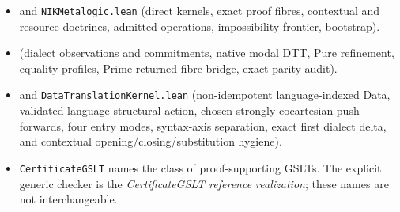 \documentclass[11pt]{article}
\newcommand{\code}[1]{\texttt{#1}}
\begin{document}
\begin{itemize}
  POPL 2019 (extensional-to-intensional translation by explicit transports),
  together with the \code{ett-to-itt} formalization and Lean4Less's adaptation.
\item {} and
  \code{NIKMetalogic.lean} (direct kernels, exact proof fibres, contextual and
  resource doctrines, admitted operations, impossibility frontier, bootstrap).
\item {}
  (dialect observations and commitments, native modal DTT, Pure refinement,
  equality profiles, Prime returned-fibre bridge, exact parity audit).
\item {} and
  \code{DataTranslationKernel.lean} (non-idempotent language-indexed Data,
  validated-language structural action, chosen strongly cocartesian push-forwards,
  four entry modes, syntax-axis separation, exact first dialect delta, and
  contextual opening/closing/substitution hygiene).
\item \code{CertificateGSLT} names the class of proof-supporting GSLTs.  The explicit
  generic checker is the \emph{CertificateGSLT reference realization}; these names are
  not interchangeable.
\end{itemize}
\end{document}
